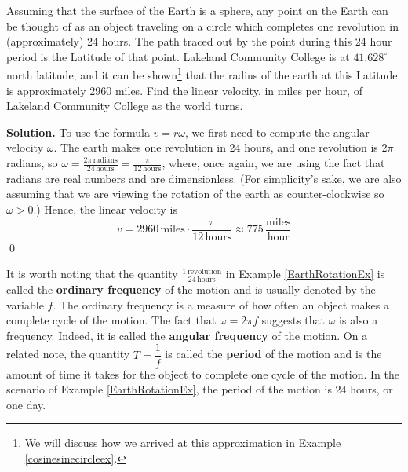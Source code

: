 \documentclass[12pt]{ximera}
\begin{document}
\begin{example}  \label{EarthRotationEx} Assuming that the surface of the Earth is a sphere, any point on the Earth can be thought of as an object traveling on a circle which completes one revolution in (approximately) 24 hours.   The path traced out by the point during this 24 hour period is the Latitude of that point.   Lakeland Community College is at $41.628^{\circ}$ north latitude, and it can be shown\footnote{We will discuss how we arrived at this approximation in Example \ref{cosinesinecircleex}.}  that the radius of the earth at this Latitude is approximately $2960$ miles.  Find the linear velocity, in miles per hour, of Lakeland Community College as the world turns.

\smallskip

{\bf Solution.}  To use the formula $v = r \omega$, we first need to compute the angular velocity $\omega$.  The earth makes one revolution in 24 hours, and one revolution is $2 \pi$ radians, so $\omega = \frac{2 \pi \, \text{radians}}{24 \, \text{hours}} = \frac{\pi}{12 \, \text{hours}}$, where, once again, we are using the fact that radians are real numbers and are dimensionless. (For simplicity's sake, we are also assuming that we are viewing the rotation of the earth as counter-clockwise so $\omega > 0$.)  Hence, the linear velocity is \[ v = 2960 \, \text{miles} \cdot \frac{\pi}{12 \, \text{hours}} \approx 775 \, \frac{\text{miles}}{\text{hour}}\]  \qed

\end{example}


It is worth noting that the quantity $\frac{1 \, \text{revolution}}{24 \, \text{hours}}$ in Example \ref{EarthRotationEx} is called the   \textbf{ordinary frequency} of the motion and is usually denoted by the variable $f$.  The ordinary frequency is a measure of how often an object makes a complete cycle of the motion.  The fact that $\omega = 2\pi f$ suggests that $\omega$ is also a frequency.  Indeed, it is called the   \textbf{angular frequency} of the motion.  On a related note, the quantity $T = \dfrac{1}{f}$ is called the \textbf{period} of the motion and is the amount of time it takes for the object to complete one cycle of the motion.  In the scenario of Example \ref{EarthRotationEx}, the period of the motion is 24 hours, or one day.  

\smallskip
\end{document}
